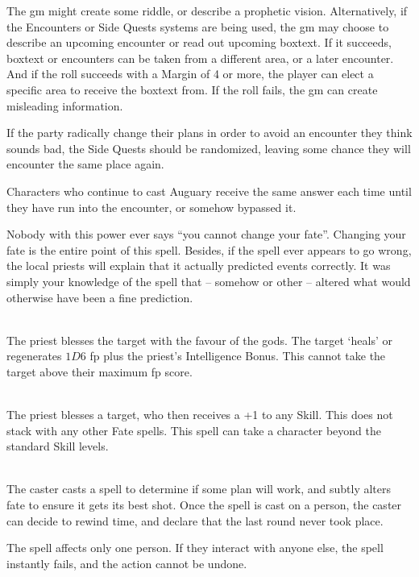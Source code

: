 \begin{multicols}{2}
The \gls{gm} might create some riddle, or describe a prophetic vision.
Alternatively, if the Encounters or Side Quests systems are being used, the \gls{gm} may choose to describe an upcoming encounter or read out upcoming boxtext.\iftoggle{verbose}{\footnote{See page \pageref{encounters}.}}{}
If it succeeds, boxtext or encounters can be taken from a different area, or a later encounter.
And if the roll succeeds with a Margin of 4 or more, the player can elect a specific area to receive the boxtext from.
If the roll fails, the \gls{gm} can create misleading information.

If the party radically change their plans in order to avoid an encounter they think sounds bad, the Side Quests should be randomized, leaving some chance they will encounter the same place again.

Characters who continue to cast Auguary receive the same answer each time until they have run into the encounter, or somehow bypassed it.

Nobody with this power ever says ``you cannot change your fate''.  Changing your fate is the entire point of this spell.  Besides, if the spell ever appears to go wrong, the local priests will explain that it actually predicted events correctly.  It was simply your knowledge of the spell that -- somehow or other -- altered what would otherwise have been a fine prediction.

\\
The priest blesses the target with the favour of the gods. The target `heals' or regenerates $1D6$ \gls{fp} plus the priest's Intelligence Bonus. This cannot take the target above their maximum \gls{fp} score.

\spelllevel

\\
The priest blesses a target, who then receives a +1 to any Skill.
This does not stack with any other Fate spells.
This spell can take a character beyond the standard Skill levels.

\\
The caster casts a spell to determine if some plan will work, and subtly alters fate to ensure it gets its best shot.
Once the spell is cast on a person, the caster can decide to rewind time, and declare that the last round never took place.

The spell affects only one person.
If they interact with anyone else, the spell instantly fails, and the action cannot be undone.


\end{multicols}
